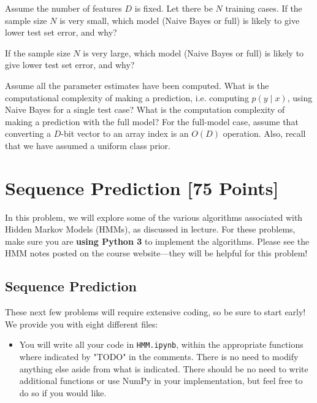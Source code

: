 \problem[2] Assume the number of features $D$ is fixed. Let there be $N$ training cases. If the sample size $N$ is very small, which model (Naive Bayes or full) is likely to give lower test set error, and why?
\begin{subsolution}
	
\end{subsolution}
\newpage

\problem[2] If the sample size $N$ is very large, which model (Naive Bayes or full) is likely to give lower test set error, and why?
\begin{subsolution}
	
\end{subsolution}
\newpage

\problem[11] Assume all the parameter estimates have been computed. What is the computational complexity of making a prediction, i.e. computing $p(y \mid x)$, using Naive Bayes for a single test case? What is the computation complexity of making a prediction with the full model? For the full-model case, assume that converting a $D$-bit vector to an array index is an $O(D)$ operation.  Also, recall that we have assumed a uniform class prior. 
\begin{subsolution}
	
\end{subsolution}
\newpage


\newpage
\section{Sequence Prediction [75 Points]}

In this problem, we will explore some of the various algorithms associated with Hidden Markov Models (HMMs), as discussed in lecture.  For these problems, make sure you are \textbf{using Python 3} to implement the algorithms. Please see the HMM notes posted on the course website---they will be helpful for this problem!

\subsection{Sequence Prediction}

These next few problems will require extensive coding, so be sure to start early! We provide you with eight different files:
\begin{itemize}
  \item You will write all your code in \texttt{HMM.ipynb}, within the appropriate functions where indicated by "TODO" in the comments. There is no need to modify anything else aside from what is indicated. There should be no need to write additional functions or use NumPy in your implementation, but feel free to do so if you would like.
\end{itemize}

